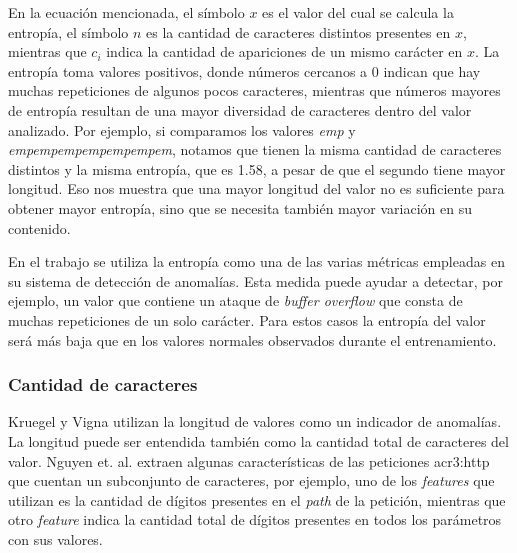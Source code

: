 En la ecuación mencionada, el símbolo $x$ es el valor del cual se calcula
la entropía, el símbolo $n$ es la cantidad de caracteres distintos
presentes en $x$, mientras que $c_{i}$ indica la cantidad de apariciones
de un mismo carácter en $x$.
La entropía toma valores positivos, donde números cercanos a 0 indican
que hay muchas repeticiones de algunos pocos caracteres, mientras que
números mayores de entropía resultan de una mayor diversidad de caracteres
dentro del valor analizado.
Por ejemplo, si comparamos los valores \textit{emp} y
\textit{empempempempempempem}, notamos que tienen la misma cantidad
de caracteres distintos y la misma entropía, que es \num{1.58}, a pesar
de que el segundo tiene mayor longitud. Eso nos muestra que una mayor
longitud del valor no es suficiente para obtener mayor entropía,
sino que se necesita también mayor variación en su contenido.

En el trabajo \cite{nguyen2011application} %
se utiliza la entropía como una de las varias métricas empleadas en su
sistema de detección de anomalías.
Esta medida puede ayudar a detectar, por ejemplo, un valor que contiene
un ataque de \textit{buffer overflow} que consta de muchas repeticiones
de un solo carácter. Para estos casos la entropía del valor será más baja
que en los valores normales observados durante el entrenamiento.


\subsubsection{Cantidad de caracteres}

Kruegel y Vigna \cite{kruegel2003anomaly} %
utilizan la longitud de valores como un indicador de anomalías. La
longitud puede ser entendida también como la cantidad total de caracteres
del valor. Nguyen et. al. \cite{nguyen2011application} %
extraen algunas características de las peticiones \gls{acr3:http} que
cuentan un subconjunto de caracteres, por ejemplo, uno de los \textit{features}
que utilizan es la cantidad de dígitos presentes en el \textit{path}
de la petición, mientras que otro \textit{feature} indica la cantidad
total de dígitos presentes en todos los parámetros con sus valores.

